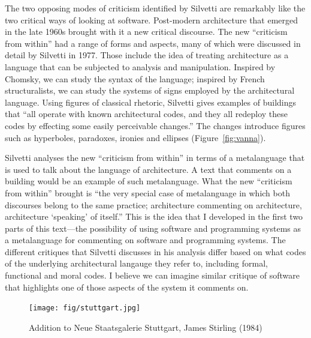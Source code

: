 The two opposing modes of criticism identified by Silvetti are remarkably like the two critical
ways of looking at software. Post-modern architecture that emerged in the late 1960s brought with
it a new critical discourse. The new ``criticism from within'' had a range of forms and
aspects, many of which were discussed in detail by Silvetti in 1977. Those include the idea of
treating architecture as a language that can be subjected to analysis and manipulation.
Inspired by Chomsky, we can study the syntax of the language; inspired by French structuralists,
we can study the systems of signs employed by the architectural language.
Using figures of classical rhetoric, Silvetti gives examples of buildings that ``all operate
with known architectural codes, and they all redeploy these codes by effecting some easily
perceivable changes.'' The changes introduce figures such as hyperboles,
paradoxes, ironies and ellipses (Figure~\ref{fig:vanna}).

Silvetti analyses the new ``criticism from within'' in terms of a metalanguage that is
used to talk about the language of architecture. A text that comments on a building would be
an example of such metalanguage. What the new ``criticism from within'' brought is
``the very special case of metalanguage in which both discourses belong to the same practice;
architecture commenting on architecture, architecture `speaking' of itself.''
This is the idea that I developed in the first two parts of this text---the possibility of
using software and programming systems as a metalanguage for commenting on software and
programming systems. The different critiques that Silvetti discusses in his analysis differ
based on what codes of the underlying architectural langauge they refer to, including
formal, functional and moral codes. I believe we can imagine similar critique of software
that highlights one of those aspects of the system it comments on.

\begin{figure}
\centering
\texttt{[image: fig/stuttgart.jpg]}
\caption{Addition to Neue Staatsgalerie Stuttgart, James Stirling (1984)}
\label{fig:stuttgart}
\end{figure}

